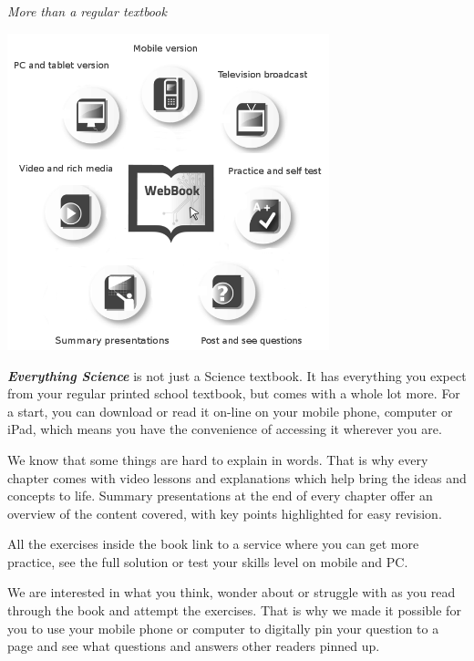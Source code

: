 
\newpage
\thispagestyle{empty}

{\normalfont\sffamily\fontsize{22}\normalfont\itshape More than a regular textbook} \par

\begin{center}
\includegraphics[width=0.70\textwidth]{title_images/morethantextbook.png}
\end{center}

\par
{\Large
\textbf{\textit{Everything Science}} is not just a Science textbook. It has everything you expect from
your regular printed school textbook, but comes with a whole lot more. For a start, you can download or read it
on-line on your mobile phone, computer or iPad, which means you have the convenience of accessing
it wherever you are.\par


We know that some things are hard to explain in words. That is why every chapter comes with video
lessons and explanations which help bring the ideas and concepts to life. Summary presentations at
the end of every chapter offer an overview of the content covered, with key points highlighted for easy
revision.\par


All the exercises inside the book link to a service where you can get more practice, see the full solution
or test your skills level on mobile and PC.\par


We are interested in what you think, wonder about or struggle with as you read through the book and
attempt the exercises. That is why we made it possible for you to use your mobile phone or computer to
digitally pin your question to a page and see what questions and answers other readers pinned up.\par


}




